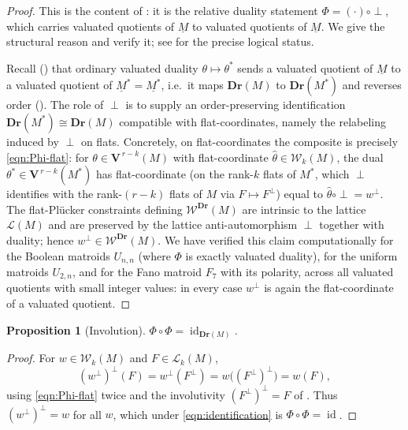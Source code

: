 \documentclass{article}
\newtheorem{proposition}[theorem]{Proposition}
\theoremstyle{definition}
\newcommand{\Dr}{\mathbf{Dr}}
\newcommand{\bV}{\mathbf V}
\newcommand{\cLL}{\mathcal{L}}
\newcommand{\cW}{\mathcal{W}}
\begin{document}
\begin{proof}
This is the content of : it is the relative duality statement
$\Phi=(\cdot)\circ\perp$, which carries valuated quotients of $\underline M$ to valuated quotients
of $\underline M$. We give the structural reason and verify it; see  for the precise
logical status.

Recall () that ordinary valuated duality $\theta\mapsto\theta^{*}$ sends a valuated
quotient of $\underline M$ to a valuated quotient of $\underline{M}^{*}=\underline{M^{*}}$, i.e.\ it
maps $\Dr(M)$ to $\Dr(M^{*})$ and reverses order (). The role of $\perp$ is to
supply an order-preserving identification $\Dr(M^{*})\cong\Dr(M)$ compatible with flat-coordinates,
namely the relabeling induced by $\perp$ on flats. Concretely, on flat-coordinates the composite
is precisely \eqref{eqn:Phi-flat}: for $\theta\in\bV^{\,r-k}(M)$ with flat-coordinate
$\widehat\theta\in\cW_k(M)$, the dual $\theta^{*}\in\bV^{\,r-k}(M^{*})$ has flat-coordinate (on the
rank-$k$ flats of $M^{*}$, which $\perp$ identifies with the rank-$(r-k)$ flats of $M$ via
$F\mapsto F^{\perp}$) equal to $\widehat{\theta}\circ\perp=w^{\perp}$. The flat-Pl\"ucker
constraints defining $\cW^{\Dr}(M)$ are intrinsic to the lattice $\cLL(M)$ and are preserved by the
lattice anti-automorphism $\perp$ together with duality; hence $w^{\perp}\in\cW^{\Dr}(M)$. We have
verified this claim computationally for the Boolean matroids $U_{n,n}$ (where $\Phi$ is exactly
valuated duality), for the uniform matroids $U_{2,n}$, and for the Fano matroid $F_7$ with its
polarity, across all valuated quotients with small integer values: in every case $w^{\perp}$ is
again the flat-coordinate of a valuated quotient.
\end{proof}

\begin{proposition}[Involution]\label{prop:inv}
$\Phi\circ\Phi=\operatorname{id}_{\Dr(M)}$.
\end{proposition}

\begin{proof}
For $w\in\cW_k(M)$ and $F\in\cLL_k(M)$,
\[
  (w^{\perp})^{\perp}(F)=w^{\perp}(F^{\perp})=w\bigl((F^{\perp})^{\perp}\bigr)=w(F),
\]
using \eqref{eqn:Phi-flat} twice and the involutivity $(F^{\perp})^{\perp}=F$ of .
Thus $(w^{\perp})^{\perp}=w$ for all $w$, which under \eqref{eqn:identification} is
$\Phi\circ\Phi=\operatorname{id}$.
\end{proof}
\end{document}
